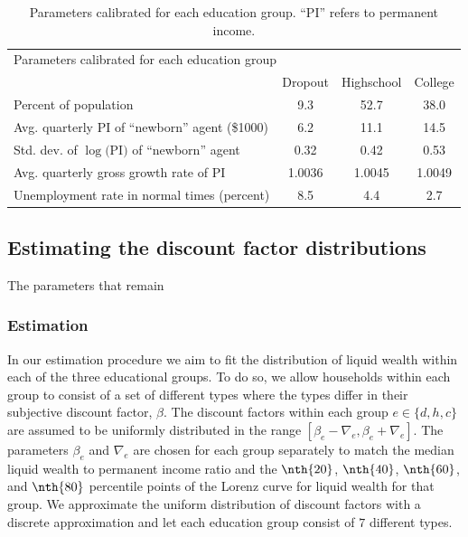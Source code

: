 \documentclass[11pt]{article}
\begin{document}
\begin{table}[th]
	\begin{center}
		\begin{tabular}{lccc}
			\toprule 
			\multicolumn{4}{l}{Parameters calibrated for each education group} \\ 
			& Dropout & Highschool & College \\ \midrule
			Percent of population & \phantom{0}9.3 & 52.7 & 38.0 \\ 
			Avg. quarterly PI of ``newborn'' agent (\$1000) & \phantom{0}6.2 & 11.1 & 14.5 \\
			Std. dev. of $\log($PI$)$ of ``newborn'' agent & 0.32 & 0.42 & 0.53 \\
			Avg. quarterly gross growth rate of PI & 1.0036 & 1.0045 & 1.0049 \\
			Unemployment rate in normal times (percent) & \phantom{0}8.5 & \phantom{0}4.4 & \phantom{0}2.7  			
			\\ \bottomrule 
		\end{tabular}
		\caption{Parameters calibrated for each education group. ``PI'' refers to permanent income.}
		\label{tab:calibEd}
	\end{center}
\end{table}




\subsection{Estimating the discount factor distributions} 
\label{sec:estim}

The parameters that remain 

\subsubsection{Estimation} 

In our estimation procedure we aim to fit the distribution of liquid wealth within each of the three educational groups. To do so, we allow households within each group to consist of a set of different types where the types differ in their subjective discount factor, $\beta$. The discount factors within each group $e\in \{d, h, c\}$ are assumed to be uniformly distributed in the range $[\beta_e-\nabla_e, \beta_e+\nabla_e]$. The parameters $\beta_e$ and $\nabla_e$ are chosen for each group separately to match the median liquid wealth to permanent income ratio and the $\nth{20}$, $\nth{40}$, $\nth{60}$, and $\nth{80}$ percentile points of the Lorenz curve for liquid wealth for that group. We approximate the uniform distribution of discount factors with a discrete approximation and let each education group consist of $7$ different types.
\end{document}
